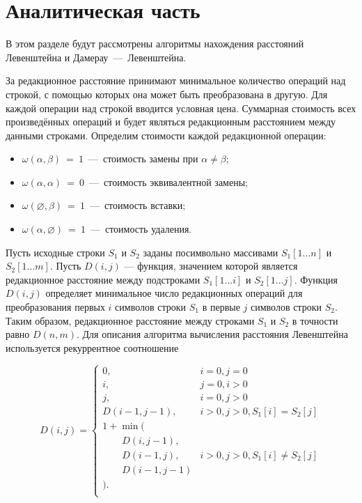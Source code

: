 \section{Аналитическая часть}

В этом разделе будут рассмотрены алгоритмы нахождения расстояний Левенштейна и Дамерау~---~Левенштейна. 
 
За редакционное расстояние принимают минимальное количество операций над строкой, с помощью которых она может быть преобразована в другую. Для каждой операции над строкой вводится условная цена. Суммарная стоимость всех произведённых операций и будет являться редакционным расстоянием между данными строками. Определим стоимости каждой редакционной операции:

\begin{itemize}
	\item $\omega(\alpha,\beta)~=~1$~---~стоимость замены при $\alpha \neq \beta$;
	\item $\omega(\alpha,\alpha)~=~0$~---~стоимость эквивалентной замены;
	\item $\omega(\varnothing,\beta)~=~1$~---~стоимость вставки;
	\item $\omega(\alpha,\varnothing)~=~1$~---~стоимость удаления.
\end{itemize}

Пусть исходные строки \(S_1\) и \(S_2\) заданы посимвольно массивами \(S_1[1...n]\) и \(S_2[1...m]\). Пусть \(D(i, j)\) --- функция, значением которой является редакционное расстояние между подстроками \(S_1[1...i]\) и \(S_2[1...j]\). Функция \(D(i, j)\) определяет минимальное число редакционных операций для преобразования первых \(i\) символов строки \(S_1\) в первые \(j\) символов строки \(S_2\). Таким образом, редакционное расстояние между строками \(S_1\) и \(S_2\) в точности равно  \(D(n, m)\). Для описания алгоритма вычисления расстояния Левенштейна используется рекуррентное соотношение

\begin{equation}
\label{eq:lev_formula}
    D(i, j) = \begin{cases}
        0, & i = 0, j = 0\\
        i, & j = 0, i > 0\\
        j, & i = 0, j > 0\\
        D(i-1, j-1), & i > 0, j > 0, S_1[i] = S_2[j]\\
        1 + \min (\\
            \qquad D(i, j-1),\\
            \qquad D(i-1, j), & i > 0, j > 0, S_1[i] \neq S_2[j]\\
            \qquad D(i-1, j-1)\\
            ).\\
    \end{cases}
\end{equation}

